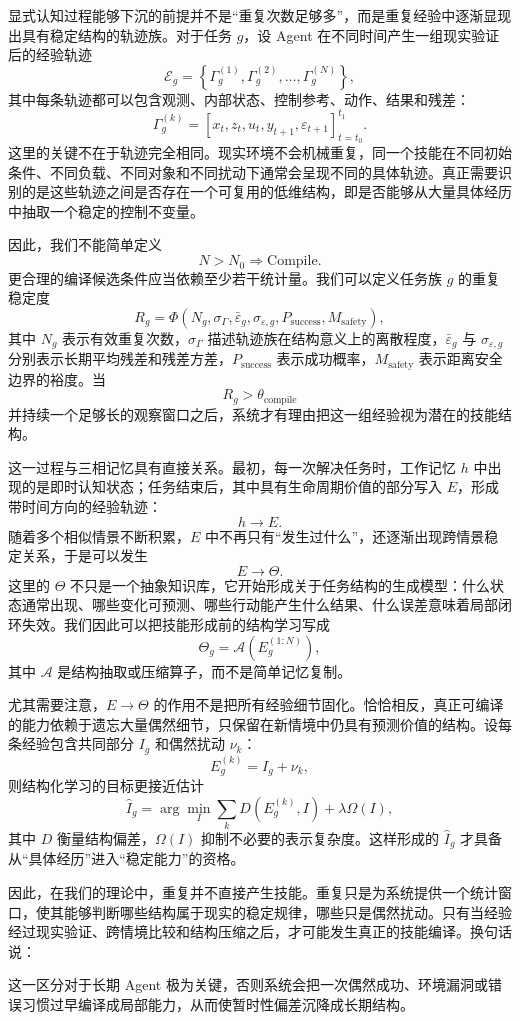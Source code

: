 显式认知过程能够下沉的前提并不是“重复次数足够多”，而是重复经验中逐渐显现出具有稳定结构的轨迹族。对于任务 $g$，设 Agent 在不同时间产生一组现实验证后的经验轨迹
\[
\mathcal E_g
=
\left\{
\Gamma_g^{(1)},
\Gamma_g^{(2)},
\ldots,
\Gamma_g^{(N)}
\right\},
\]
其中每条轨迹都可以包含观测、内部状态、控制参考、动作、结果和残差：
\[
\Gamma_g^{(k)}
=
\left[
x_t,
z_t,
u_t,
y_{t+1},
\varepsilon_{t+1}
\right]_{t=t_0}^{t_1}.
\]
这里的关键不在于轨迹完全相同。现实环境不会机械重复，同一个技能在不同初始条件、不同负载、不同对象和不同扰动下通常会呈现不同的具体轨迹。真正需要识别的是这些轨迹之间是否存在一个可复用的低维结构，即是否能够从大量具体经历中抽取一个稳定的控制不变量。

因此，我们不能简单定义
\[
N>N_0
\Rightarrow
\mathrm{Compile}.
\]
更合理的编译候选条件应当依赖至少若干统计量。我们可以定义任务族 $g$ 的重复稳定度
\[
R_g
=
\Phi
\left(
N_g,
\sigma_{\Gamma},
\bar{\varepsilon}_g,
\sigma_{\varepsilon,g},
P_{\mathrm{success}},
M_{\mathrm{safety}}
\right),
\]
其中 $N_g$ 表示有效重复次数，$\sigma_{\Gamma}$ 描述轨迹族在结构意义上的离散程度，$\bar{\varepsilon}_g$ 与 $\sigma_{\varepsilon,g}$ 分别表示长期平均残差和残差方差，$P_{\mathrm{success}}$ 表示成功概率，$M_{\mathrm{safety}}$ 表示距离安全边界的裕度。当
\[
R_g>\theta_{\mathrm{compile}}
\]
并持续一个足够长的观察窗口之后，系统才有理由把这一组经验视为潜在的技能结构。

这一过程与三相记忆具有直接关系。最初，每一次解决任务时，工作记忆 $h$ 中出现的是即时认知状态；任务结束后，其中具有生命周期价值的部分写入 $E$，形成带时间方向的经验轨迹：
\[
h
\longrightarrow
E.
\]
随着多个相似情景不断积累，$E$ 中不再只有“发生过什么”，还逐渐出现跨情景稳定关系，于是可以发生
\[
E
\longrightarrow
\Theta.
\]
这里的 $\Theta$ 不只是一个抽象知识库，它开始形成关于任务结构的生成模型：什么状态通常出现、哪些变化可预测、哪些行动能产生什么结果、什么误差意味着局部闭环失效。我们因此可以把技能形成前的结构学习写成
\[
\Theta_g
=
\mathcal A
\left(
E_g^{(1:N)}
\right),
\]
其中 $\mathcal A$ 是结构抽取或压缩算子，而不是简单记忆复制。

尤其需要注意，$E\rightarrow\Theta$ 的作用不是把所有经验细节固化。恰恰相反，真正可编译的能力依赖于遗忘大量偶然细节，只保留在新情境中仍具有预测价值的结构。设每条经验包含共同部分 $I_g$ 和偶然扰动 $\nu_k$：
\[
E_g^{(k)}
=
I_g+\nu_k,
\]
则结构化学习的目标更接近估计
\[
\hat I_g
=
\arg\min_I
\sum_{k}
D(E_g^{(k)},I)
+
\lambda\Omega(I),
\]
其中 $D$ 衡量结构偏差，$\Omega(I)$ 抑制不必要的表示复杂度。这样形成的 $\hat I_g$ 才具备从“具体经历”进入“稳定能力”的资格。

因此，在我们的理论中，重复并不直接产生技能。重复只是为系统提供一个统计窗口，使其能够判断哪些结构属于现实的稳定规律，哪些只是偶然扰动。只有当经验经过现实验证、跨情境比较和结构压缩之后，才可能发生真正的技能编译。换句话说：
\begin{statementbox}
\centering
{}
\end{statementbox}
这一区分对于长期 Agent 极为关键，否则系统会把一次偶然成功、环境漏洞或错误习惯过早编译成局部能力，从而使暂时性偏差沉降成长期结构。

